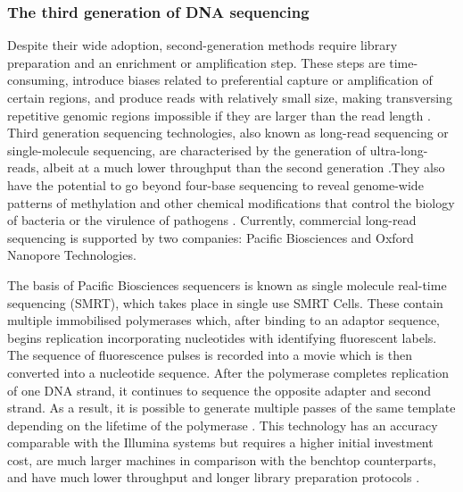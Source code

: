 \subsubsection{The third generation of DNA sequencing} \label{ssec:3rd_gen_seq}

Despite their wide adoption, second-generation methods require library preparation and an enrichment or amplification step. These steps are time-consuming, introduce biases related to preferential capture or amplification of certain regions, and produce reads with relatively small size, making transversing repetitive genomic regions impossible if they are larger than the read length \citep{hagemann_overview_2015}. Third generation sequencing technologies, also known as long-read sequencing or single-molecule sequencing, are characterised by the generation of ultra-long-reads, albeit at a much lower throughput than the second generation \citep{hoang_long-reads-based_2022}.They also have the potential to go beyond four-base sequencing to reveal genome-wide patterns of methylation and other chemical modifications that control the biology of bacteria or the virulence of pathogens \citep{korlach_going_2012}. Currently, commercial long-read sequencing is supported by two companies: Pacific Biosciences and Oxford Nanopore Technologies. 

The basis of Pacific Biosciences sequencers is known as single molecule real-time sequencing (SMRT), which takes place in single use SMRT Cells. These contain multiple immobilised polymerases which, after binding to an adaptor sequence, begins replication incorporating nucleotides with identifying fluorescent labels. The sequence of fluorescence pulses is recorded into a movie which is then converted into a nucleotide sequence. After the polymerase completes replication of one DNA strand, it continues to sequence the opposite adapter and second strand. As a result, it is possible to generate multiple passes of the same template depending on the lifetime of the polymerase \citep{hoang_long-reads-based_2022, loman_twenty_2015}. This technology has an accuracy comparable with the Illumina systems but requires a higher initial investment cost, are much larger machines in comparison with the benchtop counterparts, and have much lower throughput and longer library preparation protocols \citep{hoang_long-reads-based_2022, wenger_accurate_2019}. 

